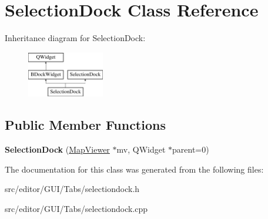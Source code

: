 \hypertarget{class_selection_dock}{\section{\-Selection\-Dock \-Class \-Reference}
\label{class_selection_dock}
}
\-Inheritance diagram for \-Selection\-Dock\-:\begin{figure}[H]
\begin{center}
\leavevmode
\includegraphics[height=2.000000cm]{class_selection_dock}
\end{center}
\end{figure}
\subsection*{\-Public \-Member \-Functions}
\begin{DoxyCompactItemize}
\item 
\hypertarget{class_selection_dock_a91607ae2abc9aabc3fecfdd10c08571c}{{\bfseries \-Selection\-Dock} (\hyperlink{class_map_viewer}{\-Map\-Viewer} $\ast$mv, \-Q\-Widget $\ast$parent=0)}\label{class_selection_dock_a91607ae2abc9aabc3fecfdd10c08571c}

\end{DoxyCompactItemize}


\-The documentation for this class was generated from the following files\-:\begin{DoxyCompactItemize}
\item 
src/editor/\-G\-U\-I/\-Tabs/selectiondock.\-h\item 
src/editor/\-G\-U\-I/\-Tabs/selectiondock.\-cpp\end{DoxyCompactItemize}
